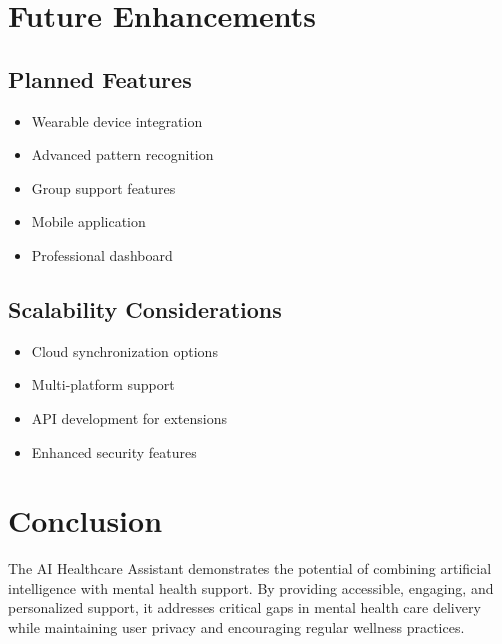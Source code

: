 \documentclass[12pt]{article}
\begin{document}
\section{Future Enhancements}

\subsection{Planned Features}
\begin{itemize}
    \item Wearable device integration
    \item Advanced pattern recognition
    \item Group support features
    \item Mobile application
    \item Professional dashboard
\end{itemize}

\subsection{Scalability Considerations}
\begin{itemize}
    \item Cloud synchronization options
    \item Multi-platform support
    \item API development for extensions
    \item Enhanced security features
\end{itemize}

\section{Conclusion}
The AI Healthcare Assistant demonstrates the potential of combining artificial intelligence with mental health support. By providing accessible, engaging, and personalized support, it addresses critical gaps in mental health care delivery while maintaining user privacy and encouraging regular wellness practices.
\end{document}
